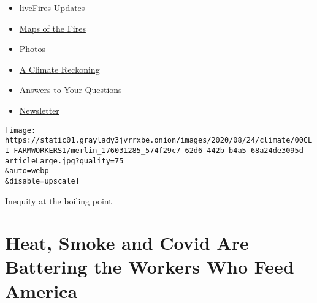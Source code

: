 \begin{itemize}
\tightlist
\item
  live\href{https://www.nytimes3xbfgragh.onion/2020/09/12/us/wildfires-live-updates.html?name=styln-california-wildfires\&region=TOP_BANNER\&block=storyline_menu_recirc\&action=click\&pgtype=Article\&impression_id=47e74881-f52b-11ea-acb7-bd1162cef823\&variant=undefined}{Fires
  Updates}
\item
  \href{https://www.nytimes3xbfgragh.onion/interactive/2020/us/fires-map-tracker.html?name=styln-california-wildfires\&region=TOP_BANNER\&block=storyline_menu_recirc\&action=click\&pgtype=Article\&impression_id=47e74882-f52b-11ea-acb7-bd1162cef823\&variant=undefined}{Maps
  of the Fires}
\item
  \href{https://www.nytimes3xbfgragh.onion/article/wildfires-photos-california-oregon-washington-state.html?name=styln-california-wildfires\&region=TOP_BANNER\&block=storyline_menu_recirc\&action=click\&pgtype=Article\&impression_id=47e74883-f52b-11ea-acb7-bd1162cef823\&variant=undefined}{Photos}
\item
  \href{https://www.nytimes3xbfgragh.onion/2020/09/10/us/climate-change-california-wildfires.html?name=styln-california-wildfires\&region=TOP_BANNER\&block=storyline_menu_recirc\&action=click\&pgtype=Article\&impression_id=47e74884-f52b-11ea-acb7-bd1162cef823\&variant=undefined}{A
  Climate Reckoning}
\item
  \href{https://www.nytimes3xbfgragh.onion/article/wildfires-california-oregon-washington.html?name=styln-california-wildfires\&region=TOP_BANNER\&block=storyline_menu_recirc\&action=click\&pgtype=Article\&impression_id=47e76f90-f52b-11ea-acb7-bd1162cef823\&variant=undefined}{Answers
  to Your Questions}
\item
  \href{https://www.nytimes3xbfgragh.onion/2020/09/09/us/california-wildfires.html?name=styln-california-wildfires\&region=TOP_BANNER\&block=storyline_menu_recirc\&action=click\&pgtype=Article\&impression_id=47e76f91-f52b-11ea-acb7-bd1162cef823\&variant=undefined}{Newsletter}
\end{itemize}

\texttt{[image: https://static01.graylady3jvrrxbe.onion/images/2020/08/24/climate/00CLI-FARMWORKERS1/merlin\_176031285\_574f29c7-62d6-442b-b4a5-68a24de3095d-articleLarge.jpg?quality=75\\\&auto=webp\\\&disable=upscale]}

Inequity at the boiling point

\hypertarget{heat-smoke-and-covid-are-battering-the-workers-who-feed-america}{%
\section{Heat, Smoke and Covid Are Battering the Workers Who Feed
America}\label{heat-smoke-and-covid-are-battering-the-workers-who-feed-america}}


